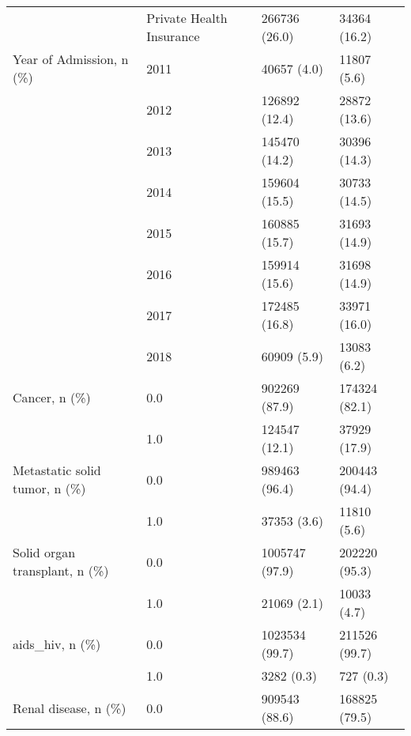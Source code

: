 \begin{tabular}{llll}
                                       & Private Health Insurance &                         266736 (26.0) &      34364 (16.2) \\
Year of Admission, n (\%) & 2011 &                           40657 (4.0) &       11807 (5.6) \\
                                       & 2012 &                         126892 (12.4) &      28872 (13.6) \\
                                       & 2013 &                         145470 (14.2) &      30396 (14.3) \\
                                       & 2014 &                         159604 (15.5) &      30733 (14.5) \\
                                       & 2015 &                         160885 (15.7) &      31693 (14.9) \\
                                       & 2016 &                         159914 (15.6) &      31698 (14.9) \\
                                       & 2017 &                         172485 (16.8) &      33971 (16.0) \\
                                       & 2018 &                           60909 (5.9) &       13083 (6.2) \\
Cancer, n (\%) & 0.0 &                         902269 (87.9) &     174324 (82.1) \\
                                       & 1.0 &                         124547 (12.1) &      37929 (17.9) \\
Metastatic solid tumor, n (\%) & 0.0 &                         989463 (96.4) &     200443 (94.4) \\
                                       & 1.0 &                           37353 (3.6) &       11810 (5.6) \\
Solid organ transplant, n (\%) & 0.0 &                        1005747 (97.9) &     202220 (95.3) \\
                                       & 1.0 &                           21069 (2.1) &       10033 (4.7) \\
aids\_hiv, n (\%) & 0.0 &                        1023534 (99.7) &     211526 (99.7) \\
                                       & 1.0 &                            3282 (0.3) &         727 (0.3) \\
Renal disease, n (\%) & 0.0 &                         909543 (88.6) &     168825 (79.5) \\

\end{tabular}
